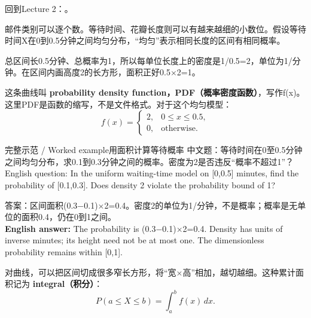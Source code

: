 回到Lecture 2：。








邮件类别可以逐个数。等待时间、花瓣长度则可以有越来越细的小数位。假设等待时间X在0到0.5分钟之间均匀分布，“均匀”表示相同长度的区间有相同概率。


总区间长0.5分钟、总概率为1，所以每单位长度上的密度是1/0.5=2，单位为1/分钟。在区间内画高度2的长方形，面积正好0.5\ensuremath{\times}2=1。


这条曲线叫 \textbf{probability density function，PDF（概率密度函数）}，写作f(x)。这里PDF是函数的缩写，不是文件格式。对于这个均匀模型：
\[
f(x)=\begin{cases}2,&0\le x\le0.5,\\0,&\text{otherwise}.\end{cases}\tag{M.9}
\]






\begin{StudyBlock}{完整示范 / Worked example}{用面积计算等待概率}
中文题：等待时间在0至0.5分钟之间均匀分布，求0.1到0.3分钟之间的概率。密度为2是否违反“概率不超过1”？\\

English question: In the uniform waiting-time model on [0,0.5] minutes, find the probability of [0.1,0.3]. Does density 2 violate the probability bound of 1?


答案：区间面积(0.3\ensuremath{-}0.1)\ensuremath{\times}2=0.4。密度2的单位为1/分钟，不是概率；概率是无单位的面积0.4，仍在0到1之间。\\

\textbf{English answer:} The probability is (0.3\ensuremath{-}0.1)\ensuremath{\times}2=0.4. Density has units of inverse minutes; its height need not be at most one. The dimensionless probability remains within [0,1].
\end{StudyBlock}


对曲线，可以把区间切成很多窄长方形，将“宽\ensuremath{\times}高”相加，越切越细。这种累计面积记为 \textbf{integral（积分）}：
\[
P(a\le X\le b)=\int_a^b f(x)\,dx.\tag{M.10}
\]


